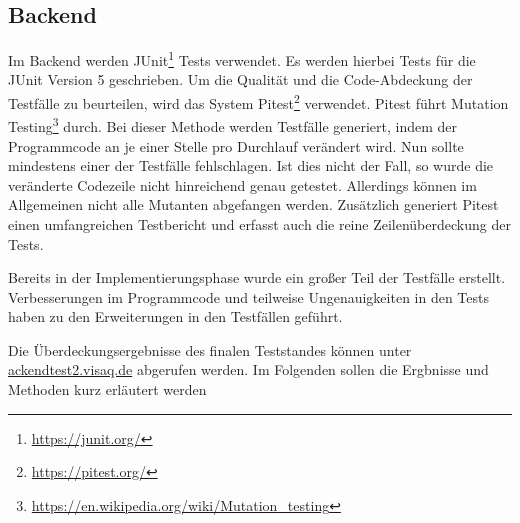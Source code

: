 \subsection{Backend}
Im Backend werden JUnit\footnote{\url{https://junit.org/}} Tests verwendet. Es werden hierbei Tests für die JUnit Version 5 geschrieben.
Um die Qualität und die Code-Abdeckung der Testfälle zu beurteilen, wird das System Pitest\footnote{\url{https://pitest.org/}} verwendet.
Pitest führt Mutation Testing\footnote{\url{https://en.wikipedia.org/wiki/Mutation_testing}} durch.
Bei dieser Methode werden Testfälle generiert, indem der Programmcode an je einer Stelle pro Durchlauf verändert wird.
Nun sollte mindestens einer der Testfälle fehlschlagen.
Ist dies nicht der Fall, so wurde die veränderte Codezeile nicht hinreichend genau getestet.
Allerdings können im Allgemeinen nicht alle Mutanten abgefangen werden.
Zusätzlich generiert Pitest einen umfangreichen Testbericht und erfasst auch die reine Zeilenüberdeckung der Tests.

Bereits in der Implementierungsphase wurde ein großer Teil der Testfälle erstellt.
Verbesserungen im Programmcode und teilweise Ungenauigkeiten in den Tests haben zu den Erweiterungen in den Testfällen geführt.

Die Überdeckungsergebnisse des finalen Teststandes können unter \url{ackendtest2.visaq.de} abgerufen werden.
Im Folgenden sollen die Ergbnisse und Methoden kurz erläutert werden

